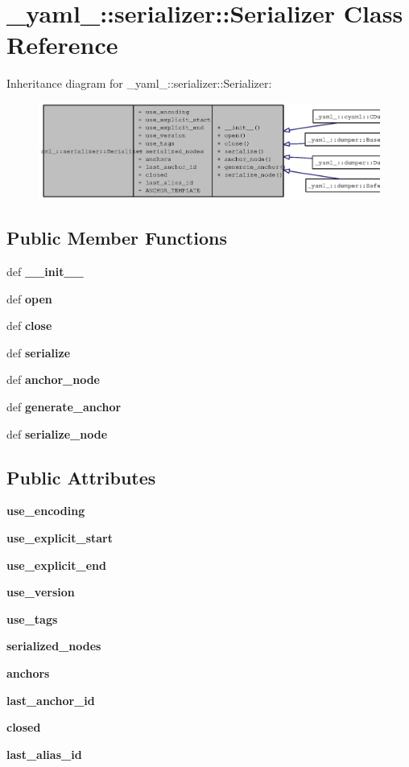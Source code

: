 \section{\_\-yaml\_\-::serializer::Serializer Class Reference}
\label{class__yaml___1_1serializer_1_1Serializer}
Inheritance diagram for \_\-yaml\_\-::serializer::Serializer:\nopagebreak
\begin{figure}[H]
\begin{center}
\leavevmode
\includegraphics[width=400pt]{class__yaml___1_1serializer_1_1Serializer__inherit__graph}
\end{center}
\end{figure}
\subsection*{Public Member Functions}
\begin{CompactItemize}
\item 
def {\bf \_\-\_\-init\_\-\_\-}
\item 
def {\bf open}
\item 
def {\bf close}
\item 
def {\bf serialize}
\item 
def {\bf anchor\_\-node}
\item 
def {\bf generate\_\-anchor}
\item 
def {\bf serialize\_\-node}
\end{CompactItemize}
\subsection*{Public Attributes}
\begin{CompactItemize}
\item 
{\bf use\_\-encoding}
\item 
{\bf use\_\-explicit\_\-start}
\item 
{\bf use\_\-explicit\_\-end}
\item 
{\bf use\_\-version}
\item 
{\bf use\_\-tags}
\item 
{\bf serialized\_\-nodes}
\item 
{\bf anchors}
\item 
{\bf last\_\-anchor\_\-id}
\item 
{\bf closed}
\item 
{\bf last\_\-alias\_\-id}
\end{CompactItemize}

